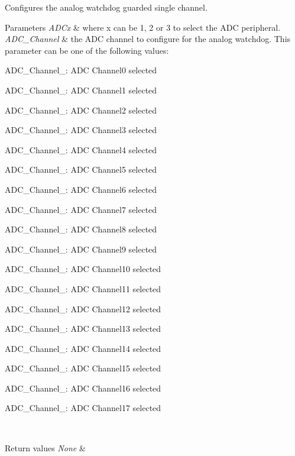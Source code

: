Configures the analog watchdog guarded single channel. 


\begin{DoxyParams}{Parameters}
{\em A\+D\+Cx} & where x can be 1, 2 or 3 to select the A\+DC peripheral. \\
\hline
{\em A\+D\+C\+\_\+\+Channel} & the A\+DC channel to configure for the analog watchdog. This parameter can be one of the following values\+: \begin{DoxyItemize}
\item A\+D\+C\+\_\+\+Channel\+\_\+: A\+DC Channel0 selected \item A\+D\+C\+\_\+\+Channel\+\_\+: A\+DC Channel1 selected \item A\+D\+C\+\_\+\+Channel\+\_\+: A\+DC Channel2 selected \item A\+D\+C\+\_\+\+Channel\+\_\+: A\+DC Channel3 selected \item A\+D\+C\+\_\+\+Channel\+\_\+: A\+DC Channel4 selected \item A\+D\+C\+\_\+\+Channel\+\_\+: A\+DC Channel5 selected \item A\+D\+C\+\_\+\+Channel\+\_\+: A\+DC Channel6 selected \item A\+D\+C\+\_\+\+Channel\+\_\+: A\+DC Channel7 selected \item A\+D\+C\+\_\+\+Channel\+\_\+: A\+DC Channel8 selected \item A\+D\+C\+\_\+\+Channel\+\_\+: A\+DC Channel9 selected \item A\+D\+C\+\_\+\+Channel\+\_\+: A\+DC Channel10 selected \item A\+D\+C\+\_\+\+Channel\+\_\+: A\+DC Channel11 selected \item A\+D\+C\+\_\+\+Channel\+\_\+: A\+DC Channel12 selected \item A\+D\+C\+\_\+\+Channel\+\_\+: A\+DC Channel13 selected \item A\+D\+C\+\_\+\+Channel\+\_\+: A\+DC Channel14 selected \item A\+D\+C\+\_\+\+Channel\+\_\+: A\+DC Channel15 selected \item A\+D\+C\+\_\+\+Channel\+\_\+: A\+DC Channel16 selected \item A\+D\+C\+\_\+\+Channel\+\_\+: A\+DC Channel17 selected \end{DoxyItemize}
\\
\hline
\end{DoxyParams}

\begin{DoxyRetVals}{Return values}
{\em None} & \\
\hline
\end{DoxyRetVals}
\mbox{\label{group___a_d_c___private___functions_ga79588d02aa8e4147f21cb90a4708366d}} 
